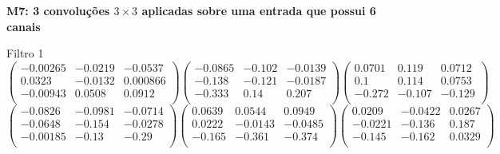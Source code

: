 \textbf{M7: 3 convoluções $3 \times 3$ aplicadas sobre uma entrada que 
possui 6 canais}

Filtro 1
{ \small
\[
\begin{pmatrix}
  -0.00265 & -0.0219 & -0.0537 \\
  0.0323 & -0.0132 & 0.000866 \\
  -0.00943 & 0.0508 & 0.0912 \\
\end{pmatrix}
\begin{pmatrix}
  -0.0865 & -0.102 & -0.0139 \\
  -0.138 & -0.121 & -0.0187 \\
  -0.333 & 0.14 & 0.207 \\
\end{pmatrix}
\begin{pmatrix}
  0.0701 & 0.119 & 0.0712 \\
  0.1 & 0.114 & 0.0753 \\
  -0.272 & -0.107 & -0.129 \\
\end{pmatrix}
\]
\[
\begin{pmatrix}
  -0.0826 & -0.0981 & -0.0714 \\
  -0.0648 & -0.154 & -0.0278 \\
  -0.00185 & -0.13 & -0.29 \\
\end{pmatrix}
\begin{pmatrix}
  0.0639 & 0.0544 & 0.0949 \\
  0.0222 & -0.0143 & -0.0485 \\
  -0.165 & -0.361 & -0.374 \\
\end{pmatrix}
\begin{pmatrix}
  0.0209 & -0.0422 & 0.0267 \\
  -0.0221 & -0.136 & 0.187 \\
  -0.145 & -0.162 & 0.0329 \\
\end{pmatrix}
\]
}


